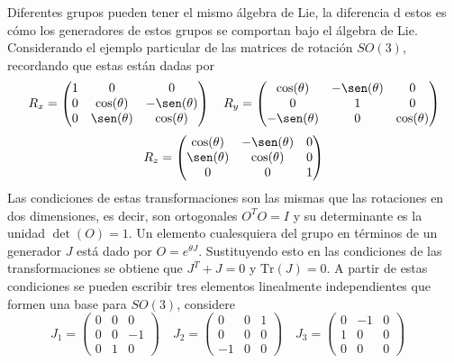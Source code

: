 Diferentes grupos pueden tener el mismo álgebra de Lie, la diferencia d estos es cómo los generadores de estos grupos se comportan bajo el álgebra de Lie.
Considerando el ejemplo particular de las matrices de rotación $SO(3)$, recordando que estas están dadas por
\begin{equation*}
  R_x = \begin{pmatrix}
    1 & 0            & 0             \\
    0 & \cos(\theta) & -\sen(\theta) \\
    0 & \sen(\theta) & \cos(\theta)
  \end{pmatrix} \quad
  R_y = \begin{pmatrix}
    \cos(\theta)  & -\sen(\theta) & 0            \\
    0             & 1             & 0            \\
    -\sen(\theta) & 0             & \cos(\theta)
  \end{pmatrix}
\end{equation*}
\begin{equation*}
  R_z = \begin{pmatrix}
    \cos(\theta) & -\sen(\theta) & 0 \\
    \sen(\theta) & \cos(\theta)  & 0 \\
    0            & 0             & 1
  \end{pmatrix}
\end{equation*}
Las condiciones de estas transformaciones son las mismas que las rotaciones en dos dimensiones, es decir, son ortogonales $O^T O = I$ y su determinante es la unidad $\det(O) = 1$. Un elemento cualesquiera del grupo en términos de un generador $J$ está dado por $O = e^{\theta J}$. Sustituyendo esto en las condiciones de las transformaciones se obtiene que $J^T + J = 0$ y $\mathrm{Tr}(J) = 0$. A partir de estas condiciones se pueden escribir tres elementos linealmente independientes que formen una base para $SO(3)$, considere
\begin{equation*}
  J_1 = \begin{pmatrix}
    0 & 0 & 0 \\ 0 & 0 & -1 \\ 0 & 1 & 0
  \end{pmatrix} \quad
  J_2 = \begin{pmatrix}
    0 & 0 & 1 \\ 0 & 0 & 0 \\ -1 & 0 & 0
  \end{pmatrix} \quad
  J_3 = \begin{pmatrix}
    0 & -1 & 0 \\ 1 & 0 & 0 \\ 0 & 0 & 0
  \end{pmatrix} \quad
\end{equation*}
